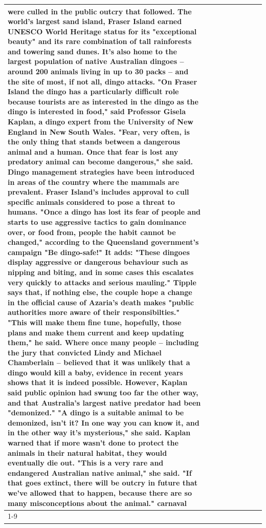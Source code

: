 \begin{table}[H]
\begin{tabular}{lllrlllll}
were culled in the public outcry that followed. The world's largest sand island, Fraser Island earned UNESCO World Heritage status for its "exceptional beauty" and its rare combination of tall rainforests and towering sand dunes. It's also home to the largest population of native Australian dingoes -- around 200 animals living in up to 30 packs -- and the site of most, if not all, dingo attacks. "On Fraser Island the dingo has a particularly difficult role because tourists are as interested in the dingo as the dingo is interested in food," said Professor Gisela Kaplan, a dingo expert from the University of New England in New South Wales. "Fear, very often, is the only thing that stands between a dangerous animal and a human. Once that fear is lost any predatory animal can become dangerous," she said. Dingo management strategies have been introduced in areas of the country where the mammals are prevalent. Fraser Island's includes approval to cull specific animals considered to pose a threat to humans. "Once a dingo has lost its fear of people and starts to use aggressive tactics to gain dominance over, or food from, people the habit cannot be changed," according to the Queensland government's campaign "Be dingo-safe!" It adds: "These dingoes display aggressive or dangerous behaviour such as nipping and biting, and in some cases this escalates very quickly to attacks and serious mauling." Tipple says that, if nothing else, the couple hope a change in the official cause of Azaria's death makes "public authorities more aware of their responsibilties." "This will make them fine tune, hopefully, those plans and make them current and keep updating them," he said. Where once many people -- including the jury that convicted Lindy and Michael Chamberlain -- believed that it was unlikely that a dingo would kill a baby, evidence in recent years shows that it is indeed possible. However, Kaplan said public opinion had swung too far the other way, and that Australia's largest native predator had been "demonized." "A dingo is a suitable animal to be demonized, isn't it? In one way you can know it, and in the other way it's mysterious," she said. Kaplan warned that if more wasn't done to protect the animals in their natural habitat, they would eventually die out. "This is a very rare and endangered Australian native animal," she said. "If that goes extinct, there will be outcry in future that we've allowed that to happen, because there are so many misconceptions about the animal." carnaval \\
\cline{1-9}

\end{tabular}
\end{table}
